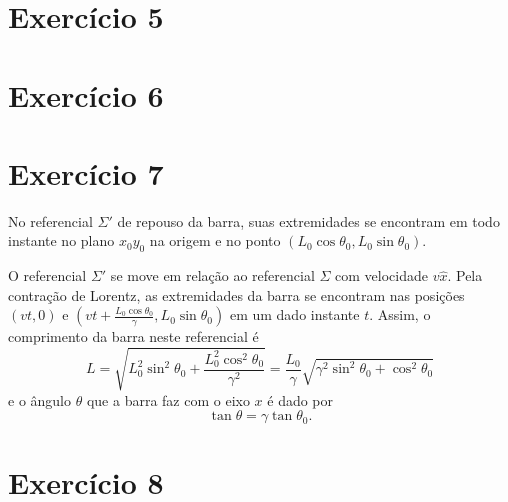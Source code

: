 \documentclass[12pt,a4paper]{article}
\numberwithin{equation}{section}
\begin{document}
\section*{Exercício 5}
\section*{Exercício 6}
\section*{Exercício 7}
No referencial \(\Sigma'\) de repouso da barra, suas extremidades se encontram em todo instante no plano \(x_0y_0\) na origem e no ponto \((L_0 \cos\theta_0, L_0 \sin \theta_0)\).

O referencial \(\Sigma'\) se move em relação ao referencial \(\Sigma\) com velocidade \(v\hat{x}\). Pela contração de Lorentz, as extremidades da barra se encontram nas posições \(\left(vt,0\right)\) e \(\left(vt + \frac{L_0\cos\theta_0}{\gamma}, L_0\sin\theta_0\right)\) em um dado instante \(t\). Assim, o comprimento da barra neste referencial é
\begin{equation*}
    L = \sqrt{L_0^2\sin^2\theta_0 + \frac{L_0^2\cos^2\theta_0}{\gamma^2}} = \frac{L_0}{\gamma} \sqrt{\gamma^2\sin^2\theta_0 + \cos^2\theta_0}
\end{equation*}
e o ângulo \(\theta\) que a barra faz com o eixo \(x\) é dado por
\begin{equation*}
    \tan \theta = \gamma \tan \theta_0.
\end{equation*}

\section*{Exercício 8}
\end{document}
